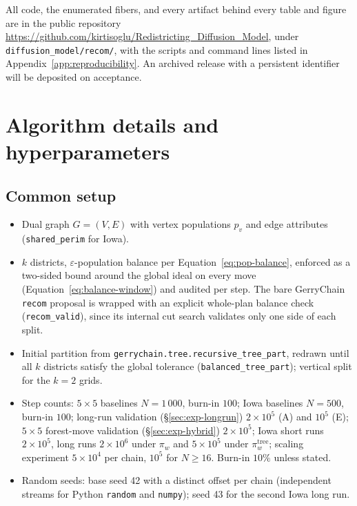 \documentclass[11pt]{article}
\begin{document}
All code, the enumerated fibers, and every artifact behind every table
and figure are in the public repository
\url{https://github.com/kirtisoglu/Redistricting_Diffusion_Model},
under \texttt{diffusion\_model/recom/}, with the scripts and command
lines listed in Appendix~\ref{app:reproducibility}. An archived
release with a persistent identifier will be deposited on acceptance.

\appendix
\section{Algorithm details and hyperparameters}\label{app:hyperparams}

\subsection{Common setup}\label{app:common}

\begin{itemize}
  \item Dual graph $G = (V, E)$ with vertex populations $p_v$ and
    edge attributes (\texttt{shared\_perim} for Iowa).
  \item $k$ districts, $\varepsilon$-population balance per
    Equation~\eqref{eq:pop-balance}, enforced as a two-sided bound around the
    global ideal on every move (Equation~\eqref{eq:balance-window})
    and audited per step. The bare GerryChain \texttt{recom} proposal
    is wrapped with an explicit whole-plan balance check
    (\texttt{recom\_valid}), since its internal cut search validates
    only one side of each split.
  \item Initial partition from
    \texttt{gerrychain.tree.recursive\_tree\_part}, redrawn until all
    $k$ districts satisfy the global tolerance
    (\texttt{balanced\_tree\_part}); vertical split for the $k = 2$
    grids.
  \item Step counts: $5 \times 5$ baselines $N = 1\,000$, burn-in
    $100$; Iowa baselines $N = 500$, burn-in $100$; long-run
    validation (\S\ref{sec:exp-longrun}) $2 \times 10^5$ (A) and
    $10^5$ (E); $5 \times 5$ forest-move validation
    (\S\ref{sec:exp-hybrid}) $2 \times 10^5$; Iowa short runs
    $2 \times 10^5$, long runs $2 \times 10^6$ under $\pi_w$ and
    $5 \times 10^5$ under $\pi_w^{\mathrm{tree}}$; scaling experiment
    $5 \times 10^4$ per chain, $10^5$ for $N \ge 16$. Burn-in $10\%$
    unless stated.
  \item Random seeds: base seed 42 with a distinct offset per chain
    (independent streams for Python \texttt{random} and
    \texttt{numpy}); seed 43 for the second Iowa long run.
\end{itemize}
\end{document}
